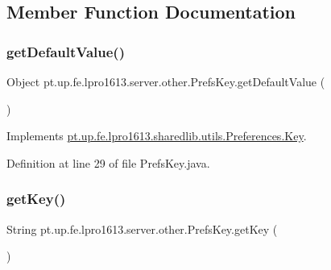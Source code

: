 \subsection{Member Function Documentation}
\hypertarget{enumpt_1_1up_1_1fe_1_1lpro1613_1_1server_1_1other_1_1_prefs_key_ab8700091048a80f746647cebab8a1876}{}\label{enumpt_1_1up_1_1fe_1_1lpro1613_1_1server_1_1other_1_1_prefs_key_ab8700091048a80f746647cebab8a1876} 
\subsubsection{\texorpdfstring{get\+Default\+Value()}{getDefaultValue()}}
{\footnotesize\ttfamily Object pt.\+up.\+fe.\+lpro1613.\+server.\+other.\+Prefs\+Key.\+get\+Default\+Value (\begin{DoxyParamCaption}{ }\end{DoxyParamCaption})}



Implements \hyperlink{interfacept_1_1up_1_1fe_1_1lpro1613_1_1sharedlib_1_1utils_1_1_preferences_1_1_key_aa78c759626a4e04578befd149e4c7310}{pt.\+up.\+fe.\+lpro1613.\+sharedlib.\+utils.\+Preferences.\+Key}.



Definition at line 29 of file Prefs\+Key.\+java.

\hypertarget{enumpt_1_1up_1_1fe_1_1lpro1613_1_1server_1_1other_1_1_prefs_key_ab78cc090bf215b90b4387473ae17524a}{}\label{enumpt_1_1up_1_1fe_1_1lpro1613_1_1server_1_1other_1_1_prefs_key_ab78cc090bf215b90b4387473ae17524a} 
\subsubsection{\texorpdfstring{get\+Key()}{getKey()}}
{\footnotesize\ttfamily String pt.\+up.\+fe.\+lpro1613.\+server.\+other.\+Prefs\+Key.\+get\+Key (\begin{DoxyParamCaption}{ }\end{DoxyParamCaption})}



